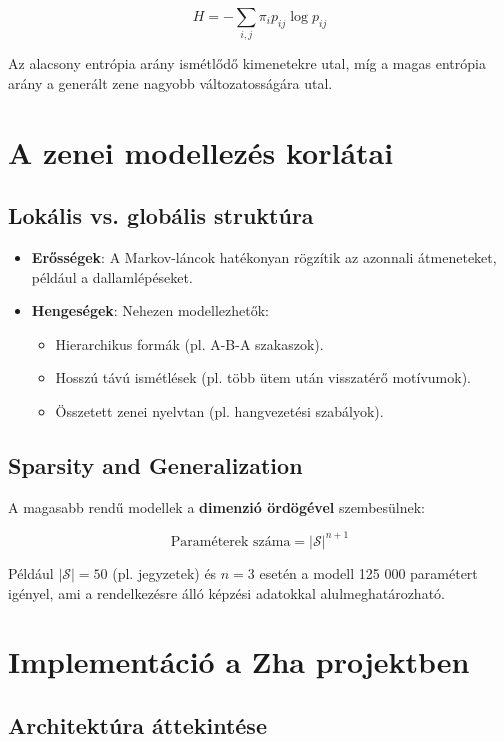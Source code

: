 \[
H = -\sum_{i,j} \pi_i p_{ij} \log p_{ij}
\]

Az alacsony entrópia arány ismétlődő kimenetekre utal, míg a magas entrópia arány a generált zene nagyobb változatosságára utal.

\section{A zenei modellezés korlátai}

\subsection{Lokális vs. globális struktúra}

\begin{itemize}
    \item \textbf{Erősségek}: A Markov-láncok hatékonyan rögzítik az azonnali átmeneteket, például a dallamlépéseket.
    \item \textbf{Hengeségek}: Nehezen modellezhetők:
    \begin{itemize}
        \item Hierarchikus formák (pl. A-B-A szakaszok).
        \item Hosszú távú ismétlések (pl. több ütem után visszatérő motívumok).
        \item Összetett zenei nyelvtan (pl. hangvezetési szabályok).
    \end{itemize}
\end{itemize}

\subsection{Sparsity and Generalization}

A magasabb rendű modellek a \textbf{dimenzió ördögével} szembesülnek:

\[
\text{Paraméterek száma} = |\mathcal{S}|^{n+1}
\]

Például \( |\mathcal{S}| = 50 \) (pl. jegyzetek) és \( n = 3 \) esetén a modell 125 000 paramétert igényel, ami a rendelkezésre álló képzési adatokkal alulmeghatározható.

\section{Implementáció a Zha projektben}

\subsection{Architektúra áttekintése}

